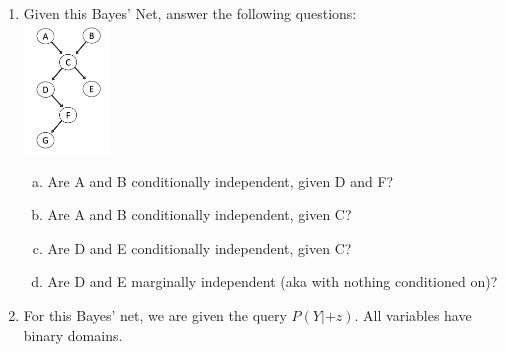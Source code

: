 \documentclass[11pt]{article}
\newif\ifsol
\begin{document}
\begin{enumerate}
    \fi
    \item Given this Bayes' Net, answer the following questions: \\
    \includegraphics[width=0.18\textwidth]{figs/net1}
    \begin{enumerate}[a)]
        \item  Are A and B conditionally independent, given D and F?\\
            \ifsol
                {\color{blue} No due to common effect (long one)}
            \else
                \vspace{1pt}
            \fi
        \item  Are A and B conditionally independent, given C?\\
            \ifsol
                {\color{blue} No due to common effect (short one)}
            \else
                \vspace{1pt}
            \fi
        \item  Are D and E conditionally independent, given C?\\
            \ifsol
                {\color{blue} Yes}
            \else
                \vspace{1pt}
            \fi
        \item  Are D and E marginally independent (aka with nothing conditioned on)?\\
            \ifsol
                {\color{blue} No due to common cause}
            \else
                \vspace{1pt}
            \fi
    \end{enumerate}
    \newpage
    \item For this Bayes’ net, we are given the query $P(Y | +z)$. All variables have binary domains. \\

\end{enumerate}
\end{document}

